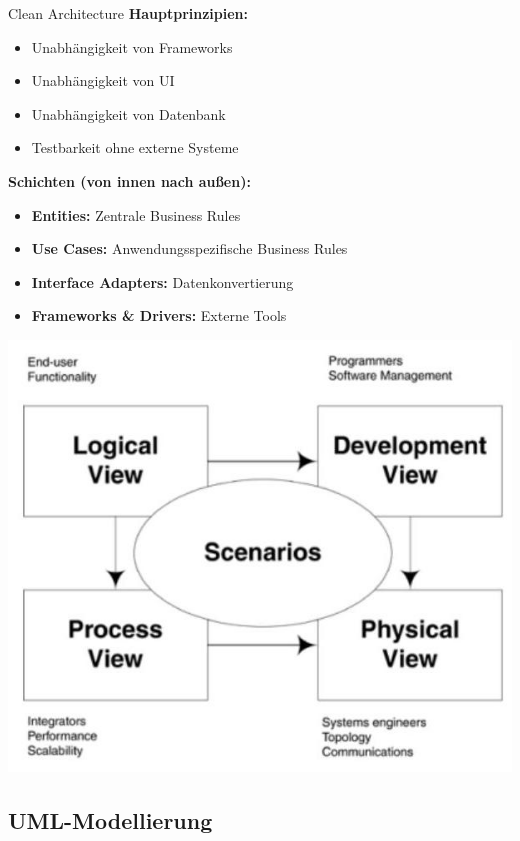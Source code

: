 \begin{concept}{Clean Architecture}
\textbf{Hauptprinzipien:}
\begin{itemize}
    \item Unabhängigkeit von Frameworks
    \item Unabhängigkeit von UI
    \item Unabhängigkeit von Datenbank
    \item Testbarkeit ohne externe Systeme
\end{itemize}

\textbf{Schichten (von innen nach außen):}
\begin{itemize}
    \item \textbf{Entities:} Zentrale Business Rules
    \item \textbf{Use Cases:} Anwendungsspezifische Business Rules
    \item \textbf{Interface Adapters:} Datenkonvertierung
    \item \textbf{Frameworks \& Drivers:} Externe Tools
\end{itemize}

\includegraphics[width=0.9\linewidth]{images/2024_12_29_0d1d7b5551ea1b4b41bdg-09}
\end{concept}

\subsection{UML-Modellierung}

